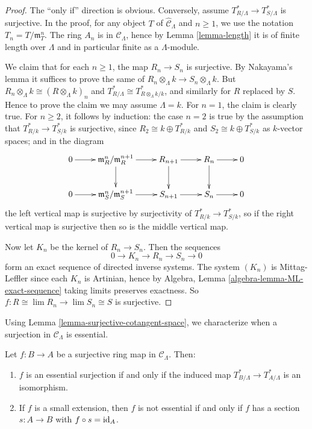 \begin{proof} 
The ``only if'' direction is obvious.  Conversely, assume $T^*_{R/\Lambda} 
\rightarrow T^*_{S/\Lambda}$ is surjective. In the proof, for any object $T$ of 
$\widehat{\mathcal C}_{\Lambda}$ and $n \geq 1$, we use the notation $T_n = 
T/\mathfrak{m}_{T}^n$. The ring $A_{n}$ is in $\mathcal C_{\Lambda}$, hence by 
Lemma \ref{lemma-length} it is of finite length over $\Lambda$ and in 
particular finite as a $\Lambda$-module.    

\medskip \noindent
We claim that for each $n \geq 1$, the map $R_n \rightarrow S_n$ is surjective. 
 By Nakayama's lemma it suffices to prove the same of $R_n \otimes_{\Lambda} k 
\rightarrow S_n \otimes_{\Lambda} k$.  But $R_n \otimes_{\Lambda} k \cong (R 
\otimes_{\Lambda} k)_n$ and $T^*_{R/\Lambda} \cong T^*_{R \otimes_{\Lambda} 
k/k}$, and similarly for $R$ replaced by $S$. Hence to prove the claim we may 
assume $\Lambda = k$. For $n = 1$, the claim is clearly true.  For $n \geq 2$, 
it follows by induction: the case $n = 2$ is true by the assumption that 
$T^*_{R/k} \rightarrow T^*_{S/k}$ is surjective, since $R_2 \cong k \oplus 
T^*_{R/k}$ and $S_2 \cong k \oplus T^*_{S/k}$ as $k$-vector spaces; and in the 
diagram
\[
\xymatrix{
0 \ar[r] & \mathfrak{m}_{R}^n/\mathfrak{m}_{R}^{n+1} \ar[r] \ar[d] & R_{n+1} 
\ar[r] \ar[d] & R_{n} \ar[r] \ar[d] & 0 \\
0 \ar[r] & \mathfrak{m}_S^{n}/\mathfrak{m}_{S}^{n+1} \ar[r] & S_{n+1} \ar[r] & 
S_{n} \ar[r] & 0
}
\]
the left vertical map is surjective by surjectivity of $T^*_{R/k} \rightarrow 
T^*_{S/k}$, so if the right vertical map is surjective then so is the middle 
vertical map.

\medskip \noindent
Now let $K_n$ be the kernel of $R_n \rightarrow S_n$.  Then the sequences 
\[ 0 \rightarrow K_n \rightarrow R_n \rightarrow S_n \rightarrow 0 \]
form an exact sequence of directed inverse systems.  The system $(K_n)$ is 
Mittag-Leffler since each $K_n$ is Artinian, hence by
Algebra, Lemma \ref{algebra-lemma-ML-exact-sequence}
taking limits preserves exactness.  So $f: R \cong \lim 
R_n \rightarrow \lim S_n \cong S$ is surjective.
\end{proof}

\noindent
Using Lemma \ref{lemma-surjective-cotangent-space}, we characterize when a 
surjection in $\mathcal C_{\Lambda}$ is essential.
\begin{lemma}
\label{lemma-essential-surjection}
Let $f: B \rightarrow A$ be a surjective ring map in $\mathcal C_{\Lambda}$.  
Then:
\begin{enumerate}
\item $f$ is an essential surjection if and only if the induced map 
$T^*_{B/\Lambda} \rightarrow T^*_{A/\Lambda}$ is an isomorphism.
\item If $f$ is a small extension, then $f$ is not essential if and only if $f$ 
has a section $s: A \rightarrow B$ with $f \circ s = \textnormal{id}_A$.
\end{enumerate}
\end{lemma}

